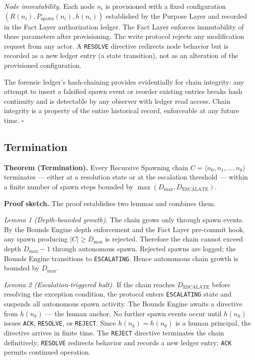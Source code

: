 \medskip
\textit{Node immutability.} Each node $n_i$ is provisioned with a fixed configuration $(R(n_i), P_{\mathrm{spawn}}(n_i), h(n_i))$ established by the Purpose Layer and recorded in the Fact Layer authorization ledger. The Fact Layer enforces immutability of these parameters after provisioning. The write protocol rejects any modification request from any actor. A \texttt{RESOLVE} directive redirects node behavior but is recorded as a new ledger entry (a state transition), not as an alteration of the provisioned configuration.

The forensic ledger's hash-chaining provides evidentially for chain integrity: any attempt to insert a falsified spawn event or reorder existing entries breaks hash continuity and is detectable by any observer with ledger read access. Chain integrity is a property of the entire historical record, enforceable at any future time. $\square$

\subsection{Termination}
\label{sec:rs-termination}

\medskip
\noindent\textbf{Theorem (Termination).} Every Recursive Spawning chain $C = \langle n_0, n_1, \ldots, n_k \rangle$ terminates — either at a resolution state or at the escalation threshold — within a finite number of spawn steps bounded by $\max(D_{\mathrm{max}}, D_{\mathrm{ESCALATE}})$.

\medskip
\noindent\textbf{Proof sketch.} The proof establishes two lemmas and combines them.

\medskip
\textit{Lemma 1 (Depth-bounded growth).} The chain grows only through spawn events. By the Bounds Engine depth enforcement and the Fact Layer pre-commit hook, any spawn producing $|C| \geq D_{\mathrm{max}}$ is rejected. Therefore the chain cannot exceed depth $D_{\mathrm{max}} - 1$ through autonomous spawn. Rejected spawns are logged; the Bounds Engine transitions to \texttt{ESCALATING}. Hence autonomous chain growth is bounded by $D_{\mathrm{max}}$.

\medskip
\textit{Lemma 2 (Escalation-triggered halt).} If the chain reaches $D_{\mathrm{ESCALATE}}$ before resolving the exception condition, the protocol enters \texttt{ESCALATING} state and suspends all autonomous spawn activity. The Bounds Engine awaits a directive from $h(n_k)$ — the human anchor. No further spawn events occur until $h(n_k)$ issues \texttt{ACK}, \texttt{RESOLVE}, or \texttt{REJECT}. Since $h(n_k) = h(n_0)$ is a human principal, the directive arrives in finite time. The \texttt{REJECT} directive terminates the chain definitively; \texttt{RESOLVE} redirects behavior and records a new ledger entry; \texttt{ACK} permits continued operation.

